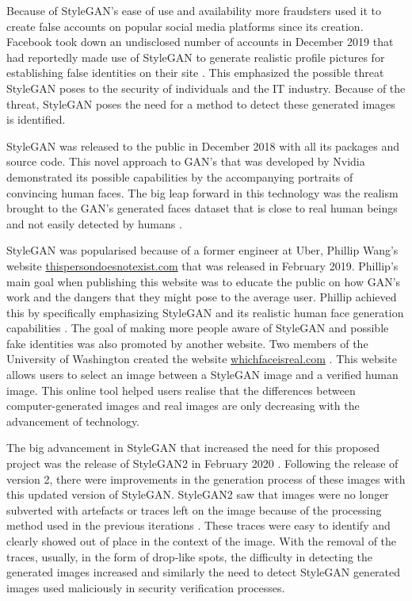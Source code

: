 Because of StyleGAN’s ease of use and availability more fraudsters used it to create false accounts on popular social media platforms since its creation. Facebook took down an undisclosed number of accounts in December 2019 that had reportedly made use of StyleGAN to generate realistic profile pictures for establishing false identities on their site \citep{Gallagher2019}. This emphasized the possible threat StyleGAN poses to the security of individuals and the IT industry. Because of the threat, StyleGAN poses the need for a method to detect these generated images is identified.

StyleGAN was released to the public in December 2018 with all its packages and source code. This novel approach to GAN’s that was developed by Nvidia demonstrated its possible capabilities by the accompanying portraits of convincing human faces. The big leap forward in this technology was the realism brought to the GAN’s generated faces dataset that is close to real human beings and not easily detected by humans \citep{Fleishman2019, Karras2019}.

StyleGAN was popularised because of a former engineer at Uber, Phillip Wang’s website \href{https://www.thispersondoesnotexist.com}{thispersondoesnotexist.com} that was released in February 2019. Phillip’s main goal when publishing this website was to educate the public on how GAN’s work and the dangers that they might pose to the average user. Phillip achieved this by specifically emphasizing StyleGAN and its realistic human face generation capabilities \cite{Fleishman2019}. The goal of making more people aware of StyleGAN and possible fake identities was also promoted by another website. Two members of the University of Washington created the website \href{https://www.whichfaceisreal.com}{whichfaceisreal.com} \cite{Fleishman2019}. This website allows users to select an image between a StyleGAN image and a verified human image. This online tool helped users realise that the differences between computer-generated images and real images are only decreasing with the advancement of technology.

The big advancement in StyleGAN that increased the need for this proposed project was the release of StyleGAN2 in February 2020 \citep{Karras2020}. Following the release of version 2, there were improvements in the generation process of these images with this updated version of StyleGAN. StyleGAN2 saw that images were no longer subverted with artefacts or traces left on the image because of the processing method used in the previous iterations \citep{Karras2020}. These traces were easy to identify and clearly showed out of place in the context of the image. With the removal of the traces, usually, in the form of drop-like spots, the difficulty in detecting the generated images increased and similarly the need to detect StyleGAN generated images used maliciously in security verification processes.

